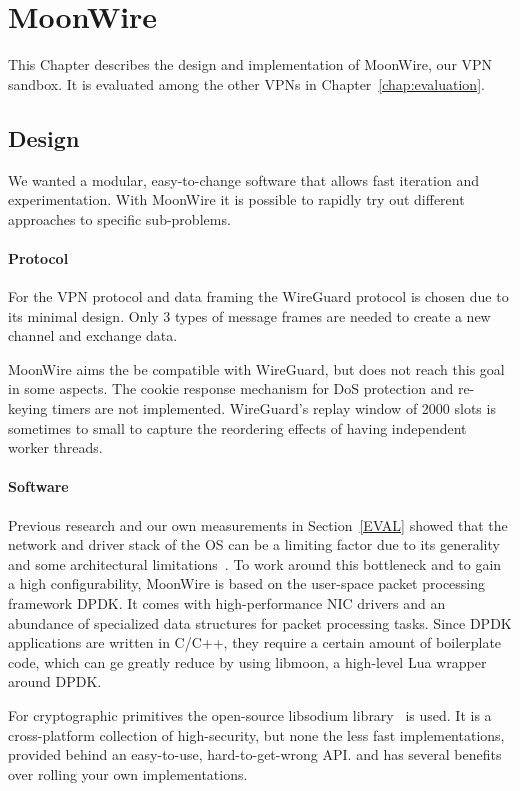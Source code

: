 \chapter{MoonWire}
\label{chap:moonwire}

This Chapter describes the design and implementation of MoonWire, our VPN sandbox.
It is evaluated among the other VPNs in Chapter~\ref{chap:evaluation}.

\section{Design}
We wanted a modular, easy-to-change software that allows fast iteration and experimentation.
With MoonWire it is possible to rapidly try out different approaches to specific sub-problems.

\subsubsection{Protocol}
For the VPN protocol and data framing the WireGuard protocol is chosen due to its minimal design. Only 3 types of message frames are needed to create a new channel and exchange data.

MoonWire aims the be compatible with WireGuard, but does not reach this goal in some aspects. The cookie response mechanism for DoS protection and re-keying timers are not implemented.
WireGuard's replay window of 2000 slots is sometimes to small to capture the reordering effects of having independent worker threads.

\subsubsection{Software}
Previous research and our own measurements in Section~\ref{EVAL} showed that the network and driver stack of the OS can be a limiting factor due to its generality and some architectural limitations~\cite{TODO}.
To work around this bottleneck and to gain a high configurability, MoonWire is based on the user-space packet processing framework DPDK. It comes with high-performance NIC drivers and an abundance of specialized data structures for packet processing tasks. Since DPDK applications are written in C/C++, they require a certain amount of boilerplate code, which can ge greatly reduce by using libmoon, a high-level Lua wrapper around DPDK.

For cryptographic primitives the open-source libsodium library~\cite{libsodium-website}  is used. It is a cross-platform collection of high-security, but none the less fast implementations, provided behind an easy-to-use, hard-to-get-wrong API.
and has several benefits over rolling your own implementations.

